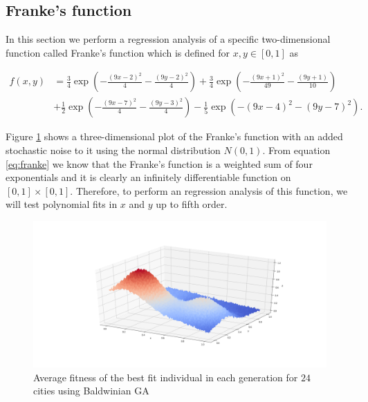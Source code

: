 \documentclass [11pt]{article}
\begin{document}
\subsection{Franke's function}
\label{sebsec:franke}
In this section we perform a regression analysis of a specific two-dimensional function called Franke's
function which is defined for $x,y\in [0,1]$ as

\begin{align}
f(x,y) &= \frac{3}{4}\exp{\left(-\frac{(9x-2)^2}{4} - \frac{(9y-2)^2}{4}\right)}+\frac{3}{4}\exp{\left(-\frac{(9x+1)^2}{49}- \frac{(9y+1)}{10}\right)} \\
&+\frac{1}{2}\exp{\left(-\frac{(9x-7)^2}{4} - \frac{(9y-3)^2}{4}\right)} -\frac{1}{5}\exp{\left(-(9x-4)^2 - (9y-7)^2\right) }.
\label{eq:franke}
\end{align}

Figure \ref{fig:Franke} shows a three-dimensional plot of the Franke's function with an added stochastic noise to it using  the normal distribution $N(0,1)$. From equation \eqref{eq:franke} we know that the Franke's function is a weighted sum of four exponentials and it is clearly an infinitely differentiable function on $[0,1] \times [0,1]$. Therefore, to perform an regression analysis of this function, we will test
polynomial fits in $x$ and $y$ up to fifth order.
\begin{figure}[H]
\centering
\includegraphics[width=1\textwidth]{figures/Franke.png}
        \caption{Average fitness of the best fit individual in each generation for $24$ cities using Baldwinian GA}
        \label{fig:Franke}
\end{figure}
\end{document}
